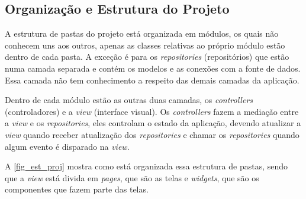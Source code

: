 \subsection{Organização e Estrutura do Projeto}

A estrutura de pastas do projeto está organizada em módulos, os quais não conhecem uns aos outros,
apenas as classes relativas ao próprio módulo estão dentro de cada pasta. A exceção é para os \emph{repositories} (repositórios)
que estão numa camada separada e contém os modelos e as conexões com a fonte de dados.
Essa camada não tem conhecimento a respeito das demais camadas da aplicação.

\newpage

Dentro de cada módulo estão as outras duas camadas, os \emph{controllers} (controladores) e a \emph{view} (interface visual).
Os \emph{controllers} fazem a mediação entre a \emph{view} e os \emph{repositories}, eles controlam o estado da aplicação,
devendo atualizar a \emph{view} quando receber atualização dos \emph{repositories} e chamar os \emph{repositories}
quando algum evento é disparado na \emph{view}.

A \autoref{fig_est_proj} mostra como está organizada essa estrutura de pastas, sendo que a \emph{view}
está divida em \emph{pages}, que são as telas e \emph{widgets}, que são os componentes que fazem parte das telas.

